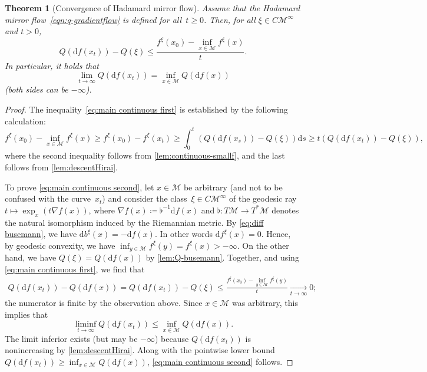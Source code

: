 \documentclass[11pt,letterpaper]{article}
\newtheorem{theorem}{Theorem}[section]
\numberwithin{equation}{section}
\newcommand{\diff}{\mathrm{d}}
\newcommand{\MM}{\mathcal{M}}
\begin{document}
\begin{theorem}[Convergence of Hadamard mirror flow]
\label{thm:main-continuous}
    Assume that the Hadamard mirror flow~\eqref{eqn:q-gradientflow} is defined for all~$t\geq0$.
    Then, for all $\xi \in C\MM^\infty$ and $t>0$,
    \begin{equation}\label{eq:main continuous first}
        Q(\diff f(x_t)) - Q(\xi) \le \frac{f^\xi(x_0) - \inf_{x \in \MM} f^\xi(x)}t.
    \end{equation}
    In particular, it holds that
    \begin{equation}\label{eq:main continuous second}
        \lim_{t \to \infty}Q(\diff f(x_t)) = \inf_{x \in \MM}Q(\diff f(x))
    \end{equation}
    (both sides can be $-\infty$).
\end{theorem}
\begin{proof}
    The inequality~\eqref{eq:main continuous first} is established by the following calculation:
    \[
        f^\xi(x_0) - \inf_{x \in \MM} f^\xi(x) \ge f^\xi(x_0) - f^\xi(x_t) \ge \int_0^t\left(Q(\diff f(x_s)) - Q(\xi)\right)\diff s \ge t\left(Q(\diff f(x_t)) - Q(\xi)\right),
    \]
    where the second inequality follows from \cref{lem:continuous-smallf}, and the last follows from \cref{lem:descentHirai}.

    To prove \cref{eq:main continuous second}, let $x \in \MM$ be arbitrary (and not to be confused with the curve~$x_t$) and consider the class~$\xi \in C\MM^\infty$ of the geodesic ray~$t \mapsto \exp_x(t \nabla f(x))$, where $\nabla f(x) \coloneqq \flat^{-1} \diff f(x)$ and $\flat \colon T\MM \to T^*\MM$ denotes the natural isomorphism induced by the Riemannian metric.
    By \cref{eq:diff busemann}, we have $\diff b^\xi(x) = -\diff f(x)$.
    In other words $\diff f^\xi(x) = 0$.
    Hence, by geodesic convexity, we have $\inf_{y \in \MM}f^\xi(y) = f^\xi(x) > -\infty$.
    On the other hand, we have $Q(\xi) = Q(\diff f(x))$ by \cref{lem:Q-busemann}.
    Together, and using \cref{eq:main continuous first}, we find that
    \begin{align*}
        Q(\diff f(x_t)) - Q(\diff f(x))
    =   Q(\diff f(x_t)) - Q(\xi)
    \leq \frac{f^\xi(x_0) - \inf_{y \in \MM}f^\xi(y)}{t}
    \underset{t \to \infty}{\longrightarrow} 0;
    \end{align*}
    the numerator is finite by the observation above.
    Since $x \in \MM$ was arbitrary, this implies that
    \[ \liminf_{t\to\infty} Q(\diff f(x_t)) \leq \inf_{x \in \MM} Q(\diff f(x)). \]
    The limit inferior exists (but may be $-\infty$) because $Q(\diff f(x_t))$ is nonincreasing by \cref{lem:descentHirai}.
    Along with the pointwise lower bound $Q(\diff f(x_t)) \geq \inf_{x \in \MM} Q(\diff f(x))$, \cref{eq:main continuous second} follows.
\end{proof}
\end{document}
